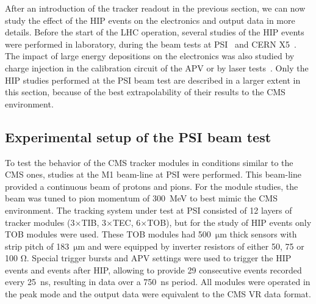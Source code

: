 
After an introduction of the tracker readout in the previous section, we can now study the effect of the HIP events on the electronics and output data in more details. Before the start of the LHC operation, several studies of the HIP events were performed in laboratory, during the beam tests at PSI~\cite{Tomalin:2003aaa} and CERN X5~\cite{Bainbridge:2002bda}. The impact of large energy depositions on the electronics was also studied by charge injection in the calibration circuit of the APV or by laser tests~\cite{Adam:2005pz}. Only the HIP studies performed at the PSI beam test are described in a larger extent in this section, because of the best extrapolability of their results to the CMS environment.

\subsection{Experimental setup of the PSI beam test}

To test the behavior of the CMS tracker modules in conditions similar to the CMS ones, studies at the M1 beam-line at PSI were performed. This beam-line provided a continuous beam of protons and pions. For the module studies, the beam was tuned to pion momentum of 300~MeV to best mimic the CMS environment. The tracking system under test at PSI consisted of 12 layers of tracker modules (3$\times$TIB, 3$\times$TEC, 6$\times$TOB), but for the study of HIP events only TOB modules were used. These TOB modules had 500~$\mathrm{\mu m}$ thick sensors with strip pitch of 183~$\mathrm{\mu}$m and were equipped by inverter resistors of either 50, 75 or 100 $\mathrm{\Omega}$. Special trigger bursts and APV settings were used to trigger the HIP events and events after HIP, allowing to provide 29 consecutive events recorded every 25~ns, resulting in data over a 750~ns period. All modules were operated in the peak mode and the output data were equivalent to the CMS VR data format. 



